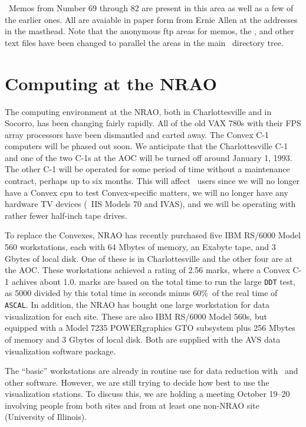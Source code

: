 \AIPS\ Memos from Number 69 through 82 are present in this area as
well as a few of the earlier ones.  All are avaiable in paper form
from Ernie Allen at the addresses in the masthead.  Note that the
anonymous ftp areas for memos, the \Cookbook, and other text files
have been changed to parallel the areas in the main \AIPS\ directory
tree.

\clearpage

\section{Computing at the NRAO}

The computing environment at the NRAO, both in Charlottesville and in
Socorro, has been changing fairly rapidly.  All of the old VAX 780s
with their FPS array processors have been dismantled and carted away.
The Convex C-1 computers will be phased out soon.  We anticipate that
the Charlottesville C-1 and one of the two C-1s at the AOC will be
turned off around January 1, 1993.  The other C-1 will be operated for
some period of time without a maintenance contract, perhaps up to six
months.  This will affect \AIPS\ users since we will no longer have a
Convex cpu to test Convex-specific matters, we will no longer have any
hardware TV devices (\eg\ IIS Models 70 and IVAS), and we will be
operating with rather fewer half-inch tape drives.

To replace the Convexes, NRAO has recently purchased five IBM
RS/6000 Model 560 workstations, each with 64 Mbytes of memory, an
Exabyte tape, and 3 Gbytes of local disk.  One of these is in
Charlottesville and the other four are at the \hbox{AOC}.  These
workstations achieved a rating of 2.56 \AIPS marks, where a Convex C-1
achives about 1.0.  \AIPS marks are based on the total time to run
the large {\tt DDT} test, as 5000 divided by this total time in
seconds minus 60\%\ of the real time of \hbox{{\tt ASCAL}}.  In
addition, the NRAO has bought one large workstation for data
visualization for each site.  These are also IBM RS/6000 Model 560s,
but equipped with a Model 7235 POWERgraphics GTO subsystem plus 256
Mbytes of memory and 3 Gbytes of local disk.  Both are supplied with
the AVS data visualization software package.

The ``basic'' workstations are already in routine use for data
reduction with \AIPS\ and other software.  However, we are still
trying to decide how best to use the visualization stations.  To
discuss this, we are holding a meeting October 19--20 involving people
from both sites and from at least one non-NRAO site (University of
Illinois).

